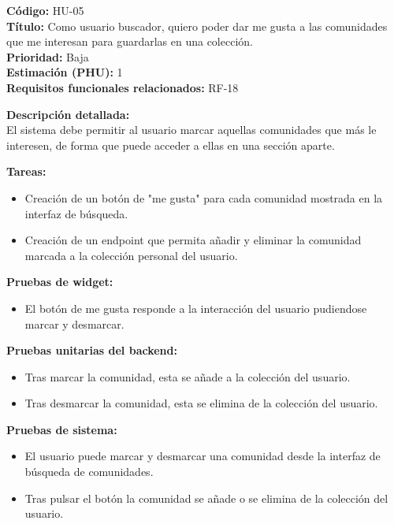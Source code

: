 \begin{tarjetaHU}
\textbf{Código:} HU-05 \\
\textbf{Título:} Como usuario buscador, quiero poder dar me gusta a las comunidades que me interesan para guardarlas en una colección. \\
\textbf{Prioridad:} Baja \\
\textbf{Estimación (PHU):} 1 \\
\textbf{Requisitos funcionales relacionados:} RF-18

\vspace{0.5em}
\textbf{Descripción detallada:} \\
El sistema debe permitir al usuario marcar aquellas comunidades que más le interesen, de forma que puede acceder a ellas en una sección aparte.

\vspace{0.5em}
\textbf{Tareas:}
\begin{itemize}[left=0pt]
  \item Creación de un botón de "me gusta" para cada comunidad mostrada en la interfaz de búsqueda.
  \item Creación de un endpoint que permita añadir y eliminar la comunidad marcada a la colección personal del usuario.
\end{itemize}

\vspace{0.5em}
\textbf{Pruebas de widget:}
\begin{itemize}[left=0pt]
  \item El botón de me gusta responde a la interacción del usuario pudiendose marcar y desmarcar.
\end{itemize}
\textbf{Pruebas unitarias del backend:}
\begin{itemize}[left=0pt]
  \item Tras marcar la comunidad, esta se añade a la colección del usuario.
  \item Tras desmarcar la comunidad, esta se elimina de la colección del usuario.
\end{itemize}
\textbf{Pruebas de sistema:}
\begin{itemize}[left=0pt]
  \item El usuario puede marcar y desmarcar una comunidad desde la interfaz de búsqueda de comunidades.
  \item Tras pulsar el botón la comunidad se añade o se elimina de la colección del usuario.
\end{itemize}

\end{tarjetaHU}



